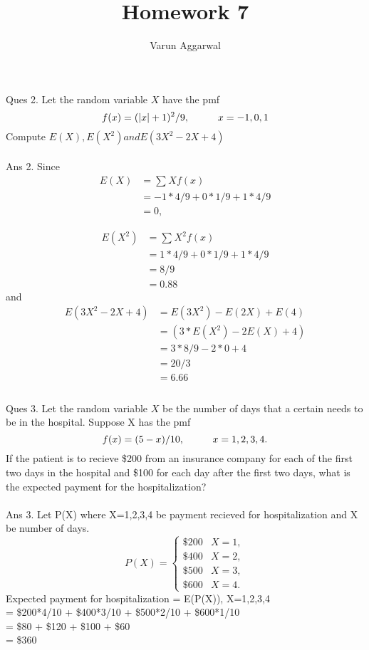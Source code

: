 \documentclass{article}
\title{Homework 7}
\author{Varun Aggarwal}
\begin{document}
\maketitle

\newpage
\noindent
Ques 2. Let the random variable $X$ have the pmf \\
$$f(x) = (|x| +1)^2/9  , \hspace{10mm}    x=-1,0,1$$
\hspace{10mm} Compute $E(X),E(X^2) and E(3X^2 - 2X + 4)$\\
\\
Ans 2. Since 
\begin{align*}
E(X) &= \sum_{} Xf(x) \\
     &= -1*4/9 + 0*1/9 + 1*4/9 \\
     &= 0,
\end{align*}

\begin{align*}
E(X^2) &= \sum_{} X^2f(x)\\
        &= 1*4/9 + 0*1/9 + 1*4/9\\
        &= 8/9\\
        &= 0.88
\end{align*}
\hspace{10mm} and
\begin{align*}
E(3X^2-2X+4) &= E(3X^2) - E(2X) + E(4)\\
             &= (3*E(X^2) - 2E(X) + 4)\\
             &= 3*8/9 - 2*0 + 4\\
             &= 20/3\\
             &= 6.66\\
\end{align*}
\\
Ques 3. Let the random variable $X$ be the number of days that a certain needs to be in the hospital. Suppose X has the pmf\\
$$ f(x) = (5-x)/10, \hspace{10mm} x=1,2,3,4.\\$$
If the patient is to recieve \$200 from an insurance company for each of the first two days in the hospital and \$100 for each day after the first two days, what is the expected payment for the hospitalization?\\
\\
Ans 3. Let P(X) where X=1,2,3,4 be payment recieved for hospitalization and X be number of days.\\
\[  P(X) = \left \{
\begin{array}{ll}
			\$200 & X=1, \\
			\$400 & X=2, \\
			\$500 & X=3, \\
			\$600 & X=4.
\end{array} 
\right. \]
\noindent
Expected payment for hospitalization = E(P(X)),\hspace{5mm} X=1,2,3,4\\
= \$200*4/10 + \$400*3/10 + \$500*2/10 + \$600*1/10\\
= \$80 + \$120 + \$100 + \$60 \\
= \$360\\
\\
\end{document}
